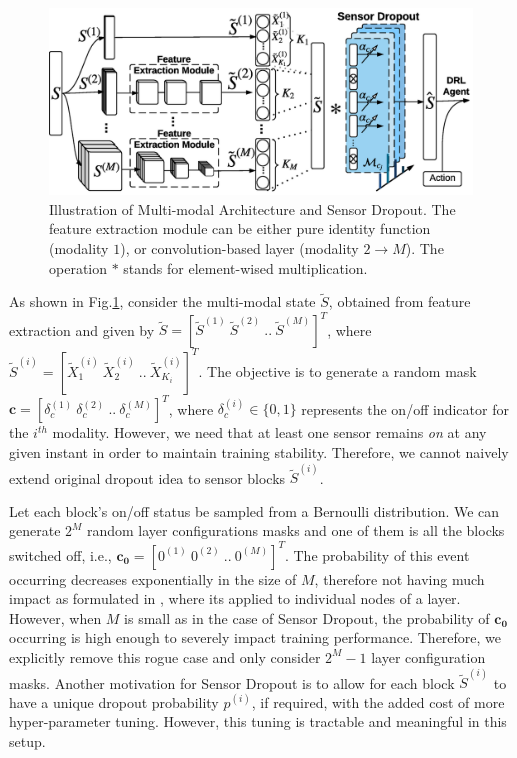 \documentclass[../thesis.tex]{subfiles}
\begin{document}
\begin{figure}[t]
	\begin{center}
	\centerline{\includegraphics[width=0.8\columnwidth,trim= 0 850 1020 30, clip=true]{./MultimodalDRL/fig/sd}}
	\caption{Illustration of Multi-modal Architecture and Sensor Dropout. The feature extraction module can be either pure identity function (modality $1$), or convolution-based layer (modality $2 \to M$). The operation $*$ stands for element-wised multiplication.}
	\label{fig:Multi-SD}
	\end{center}
\end{figure} 



As shown in Fig.\ref{fig:Multi-SD}, consider the multi-modal state $\tilde{S}$, obtained from feature extraction and given by $\tilde{S}=[\tilde{S}^{(1)}~\tilde{S}^{(2)}~..~\tilde{S}^{(M)}]^T$, where $\tilde{S}^{(i)}= [\tilde{X}_1^{(i)}~\tilde{X}_2^{(i)}~..~\tilde{X}_{K_i}^{(i)}]^T$. 
The objective is to generate a random mask
$\mathbf{c} = [\delta_{c}^{(1)}~\delta_{c}^{(2)}~..~\delta_{c}^{(M)}]^T$, where $\delta_{c}^{(i)} \in \{0,1\}$ represents the on/off indicator for the $i^{th}$ modality.
However, we need that at least one sensor remains \emph{on} at any given instant in order to maintain training stability. Therefore, we cannot naively extend original dropout idea to sensor blocks $\tilde{S}^{(i)}$.

Let each block's on/off status be sampled from a Bernoulli distribution. We can generate $2^M$ random layer configurations masks and one of them is all the blocks switched off, i.e.,  $\mathbf{{c_0}} = [0^{(1)}~0^{(2)}~..~0^{(M)}]^T$. The probability of this event occurring decreases exponentially in the size of $M$, therefore not having much impact as formulated in \citet{dropout}, where its applied to individual nodes of a layer. However, when $M$ is small as in the case of Sensor Dropout, the probability of $\mathbf{{c_0}}$ occurring is high enough to severely impact training performance. Therefore, we explicitly remove this rogue case and only consider $2^M-1$ layer configuration masks. Another motivation for Sensor Dropout is to allow for each block $\tilde{S}^{(i)}$ to have a unique dropout probability $p^{(i)}$, if required, with the added cost of more hyper-parameter tuning. However, this tuning is tractable and meaningful in this setup.
\end{document}
